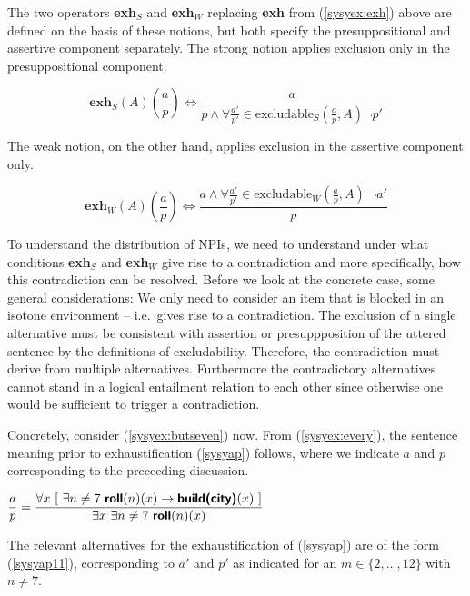 \documentclass[output=paper,colorlinks,citecolor=brown,
]{langscibook}
\def\refp#1{(\ref{sy#1})}
\begin{document}
The two operators \textbf{exh}$_{S}$ and \textbf{exh}$_{W}$ replacing \textbf{exh} from \refp{syex:exh} above are defined on the basis of these notions, but both specify the presuppositional and assertive component separately. The strong notion applies exclusion only in the presuppositional component.

\begin{equation*}
\textbf{exh}_S(A)\left(\frac{a}{p}\right) \Leftrightarrow \frac{a}{p \land \forall \frac{a'}{p'} \in \text{excludable}_S\left(\frac{a}{p},A\right) \neg p'}
\end{equation*}

The weak notion, on the other hand, applies exclusion in the assertive component only.  

\begin{equation*}
\textbf{exh}_W(A)\left(\frac{a}{p}\right) \Leftrightarrow \frac{a \land \forall \frac{a'}{p'}  \in \text{excludable}_W\left(\frac{a}{p},A\right) \ \neg a'}{p}
\end{equation*}

To understand the distribution of NPIs, we need to understand under what conditions  \textbf{exh}$_S$ and \textbf{exh}$_W$ give rise to a contradiction and more specifically, how this contradiction can be resolved.  Before we look at the concrete case, some general considerations: We only need to consider an item that is blocked  in an isotone environment -- i.e.\ gives rise to a contradiction.
The exclusion of a single alternative must be consistent with assertion or presuppposition of the uttered sentence by the definitions of excludability.  Therefore, the contradiction must derive from multiple alternatives.  Furthermore the contradictory alternatives cannot stand in a logical entailment relation to each other since otherwise one would be sufficient to trigger a contradiction.

Concretely, consider \refp{syex:butseven} now.  From \refp{syex:every}, the sentence meaning prior to exhaustification \refp{syap} follows, where we indicate $a$ and $p$ corresponding to the preceeding discussion. 

\ea \label{syap}$\displaystyle \frac{a}{p} = 
\frac{\forall x\ [\ \exists n \neq 7\  \textsf{\textbf{roll}}(n)(x)  \rightarrow \textsf{\textbf{build(city)}}(x)\ ]}{\exists x\  \exists n \neq 7\  \textsf{\textbf{roll}}(n)(x)}$
\z

The relevant  alternatives for the exhaustification of \refp{syap} are of the form \refp{syap11}, corresponding to $a'$ and $p'$ as indicated for an $m \in \{2, \dots, 12\}$ with $n \neq 7$.
\end{document}
